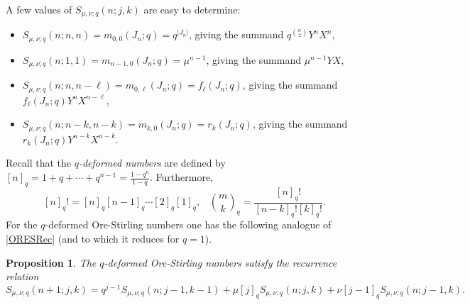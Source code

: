\documentclass[10pt]{amsart}
\newtheorem{proposition}[theorem]{Proposition}%
\begin{document}
A few values of $S_{\mu,\nu;q}(n;j,k)$ are easy to determine:
\begin{itemize}
\item $S_{\mu,\nu;q}(n;n,n)=m_{0,0}(J_n;q)=q^{|J_n|}$, giving the summand $q^{\binom{n}{2}} Y^nX^n$,
\item $S_{\mu,\nu;q}(n;1,1)=m_{n-1,0}(J_n;q)=\mu^{n-1}$, giving the summand $\mu^{n-1} YX$,
\item $S_{\mu,\nu;q}(n;n,n-\ell)=m_{0,\ell}(J_n;q)=f_{\ell}(J_n;q)$, giving the summand $f_{\ell}(J_n;q)Y^nX^{n-\ell}$, 
\item $S_{\mu,\nu;q}(n;n-k,n-k)=m_{k,0}(J_n;q)=r_{k}(J_n;q)$, giving the summand $r_{k}(J_n;q)Y^{n-k}X^{n-k}$.
\end{itemize}
Recall that the {\em $q$-deformed numbers} are defined by $[n]_q=1+q+\cdots + q^{n-1}=\frac{1-q^n}{1-q}$. Furthermore, 
$$
[n]_q!=[n]_q [n-1]_q\cdots [2]_q[1]_q, \, \,\,\,\, \binom{m}{k}_q =\frac{[n]_q!}{[n-k]_q![k]_q!}.
$$ 
For the $q$-deformed Ore-Stirling numbers one has the following analogue of \eqref{ORESRec} (and to which it reduces for $q=1$).
\begin{proposition}\label{PROPQORESRec} The $q$-deformed Ore-Stirling numbers satisfy the recurrence relation
\begin{equation}\label{QORESRec}
S_{\mu,\nu;q}(n+1;j,k) =q^{j-1}S_{\mu,\nu;q}(n;j-1,k-1)+\mu [j]_q S_{\mu,\nu;q}(n;j,k) +\nu [j-1]_q S_{\mu,\nu;q}(n;j-1,k).  
\end{equation}
\end{proposition}
\end{document}
